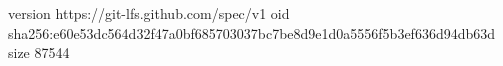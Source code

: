 version https://git-lfs.github.com/spec/v1
oid sha256:e60e53dc564d32f47a0bf685703037bc7be8d9e1d0a5556f5b3ef636d94db63d
size 87544
